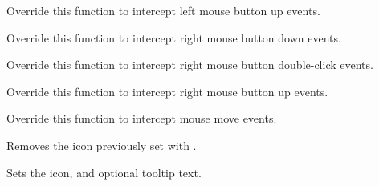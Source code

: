 
Override this function to intercept left mouse button up events.

\label{wxtaskbaricononrbuttondown}


Override this function to intercept right mouse button down events.

\label{wxtaskbaricononrbuttondclick}


Override this function to intercept right mouse button double-click events.

\label{wxtaskbaricononrbuttonup}


Override this function to intercept right mouse button up events.

\label{wxtaskbaricononmousemove}


Override this function to intercept mouse move events.

\label{wxtaskbariconremoveicon}


Removes the icon previously set with .

\label{wxtaskbariconseticon}


Sets the icon, and optional tooltip text.


